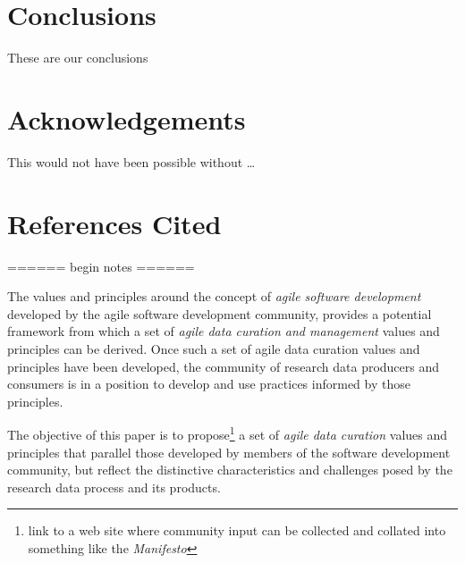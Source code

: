 \documentclass[paper]{ijdc-v9}
\begin{document}
\section{Conclusions}\label{conclusions}

These are our conclusions

\section{Acknowledgements}\label{acknowledgements}

This would not have been possible without \ldots{}

\section{References Cited}\label{references-cited}

====== begin notes ======

The values and principles around the concept of \emph{agile software
development} developed by the agile software development community,
provides a potential framework from which a set of \emph{agile data
curation and management} values and principles can be derived. Once such
a set of agile data curation values and principles have been developed,
the community of research data producers and consumers is in a position
to develop and use practices informed by those principles.

The objective of this paper is to propose\footnote{link to a web site
  where community input can be collected and collated into something
  like the \emph{Manifesto}} a set of \emph{agile data curation} values
and principles that parallel those developed by members of the software
development community, but reflect the distinctive characteristics and
challenges posed by the research data process and its products.
\end{document}
